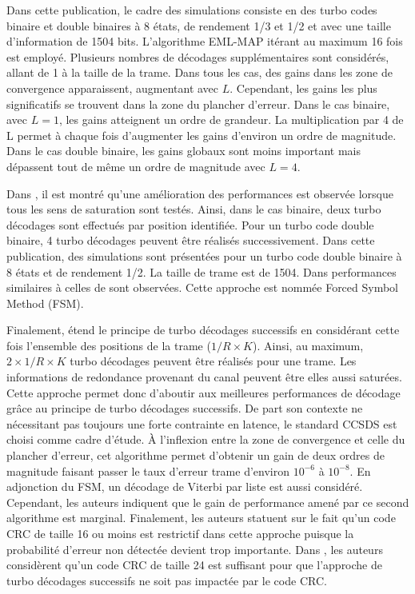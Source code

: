 Dans cette publication, le cadre des simulations consiste en des turbo codes binaire et double binaires à 8 états, de 
rendement 1/3 et 1/2 et avec une taille d'information de 1504 bits. L'algorithme EML-MAP itérant au maximum 16 fois est
employé. Plusieurs nombres de décodages supplémentaires sont considérés, allant de 1 à la taille de la trame. Dans tous 
les cas, des gains dans les zone de convergence apparaissent, augmentant avec $L$. Cependant, les gains les plus significatifs
se trouvent dans la zone du plancher d'erreur. Dans le cas binaire, avec $L=1$, les gains atteignent un ordre de grandeur. 
La multiplication par 4 de L permet à chaque fois d'augmenter les gains d'environ un ordre de magnitude.\\
Dans le cas double binaire, les gains globaux sont moins important mais dépassent tout de même un ordre de magnitude 
avec $L=4$. 

Dans \cite{fsm}, il est montré qu'une amélioration des performances est observée lorsque tous les sens de 
saturation sont testés. Ainsi, dans le cas binaire, deux turbo décodages sont effectués par position identifiée. Pour 
un turbo code double binaire, 4 turbo décodages peuvent être réalisés successivement. Dans cette publication, des 
simulations sont présentées pour un turbo code double binaire à 8 états et de rendement 1/2. La taille de trame est 
de 1504. Dans performances similaires à celles de \cite{cim} sont observées. Cette approche est nommée
Forced Symbol Method (FSM).

Finalement, \cite{pflet} étend le principe de turbo décodages successifs en considérant cette fois l'ensemble des positions de la trame ($1/R\times K$). 
Ainsi, au maximum, $2\times 1/R\times K$ turbo décodages peuvent être réalisés pour une trame. Les informations
de redondance provenant du canal peuvent être elles aussi saturées. Cette approche permet donc d'aboutir aux meilleures
performances de décodage grâce au principe de turbo décodages successifs. De part son contexte ne nécessitant pas toujours 
une forte contrainte en latence, le standard CCSDS est choisi comme cadre d'étude. À l'inflexion entre la zone de convergence 
et celle du plancher d'erreur, cet algorithme permet d'obtenir un 
gain de deux ordres de magnitude faisant passer le taux d'erreur trame d'environ $10^{-6}$ à $10^{-8}$. En adjonction du 
FSM, un décodage de Viterbi par liste est aussi considéré. Cependant, les auteurs indiquent que 
le gain de performance amené par ce second algorithme est marginal. Finalement, les auteurs statuent sur 
le fait qu'un code CRC de taille 16 ou moins est restrictif dans cette approche puisque la probabilité d'erreur non 
détectée devient trop importante. Dans \cite{fsm}, les auteurs considèrent qu'un code CRC de taille 24 est suffisant pour 
que l'approche de turbo décodages successifs ne soit pas impactée par le code CRC.

